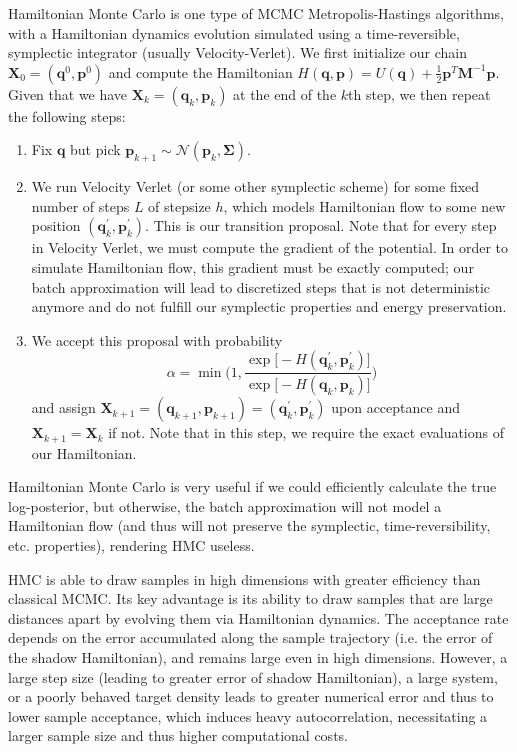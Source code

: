 \documentclass{article}
\begin{document}
    Hamiltonian Monte Carlo is one type of MCMC Metropolis-Hastings algorithms, with a Hamiltonian dynamics evolution simulated using a time-reversible, symplectic integrator (usually Velocity-Verlet). We first initialize our chain $\mathbf{X}_0 = (\mathbf{q}^0, \mathbf{p}^0)$ and compute the Hamiltonian $H(\mathbf{q}, \mathbf{p}) = U(\mathbf{q}) + \frac{1}{2} \mathbf{p}^T \mathbf{M}^{-1} \mathbf{p}$. Given that we have $\mathbf{X}_k = (\mathbf{q}_k, \mathbf{p}_k)$ at the end of the $k$th step, we then repeat the following steps: 
    \begin{enumerate}
        \item Fix $\mathbf{q}$ but pick $\mathbf{p}_{k+1} \sim \mathcal{N}(\mathbf{p}_k, \mathbf{\Sigma})$. 
        \item We run Velocity Verlet (or some other symplectic scheme) for some fixed number of steps $L$ of stepsize $h$, which models Hamiltonian flow to some new position $(\mathbf{q}_k^\prime, \mathbf{p}_k^\prime)$. This is our transition proposal. Note that for every step in Velocity Verlet, we must compute the gradient of the potential. In order to simulate Hamiltonian flow, this gradient must be exactly computed; our batch approximation will lead to discretized steps that is not deterministic anymore and do not fulfill our symplectic properties and energy preservation. 
        \item We accept this proposal with probability 
        \[\alpha = \min \bigg( 1, \frac{\exp \big[ -H(\mathbf{q}_k^\prime, \mathbf{p}_k^\prime) \big]}{\exp \big[ -H(\mathbf{q}_k, \mathbf{p}_k)\big]} \bigg)\]
        and assign $\mathbf{X}_{k+1} = (\mathbf{q}_{k+1}, \mathbf{p}_{k+1}) = (\mathbf{q}_k^\prime, \mathbf{p}_k^\prime)$ upon acceptance and $\mathbf{X}_{k+1} = \mathbf{X}_k$ if not. Note that in this step, we require the exact evaluations of our Hamiltonian. 
    \end{enumerate}
    Hamiltonian Monte Carlo is very useful if we could efficiently calculate the true log-posterior, but otherwise, the batch approximation will not model a Hamiltonian flow (and thus will not preserve the symplectic, time-reversibility, etc. properties), rendering HMC useless. 

    HMC is able to draw samples in high dimensions with greater efficiency than classical MCMC. Its key advantage is its ability to draw samples that are large distances apart by evolving them via Hamiltonian dynamics. The acceptance rate depends on the error accumulated along the sample trajectory (i.e. the error of the shadow Hamiltonian), and remains large even in high dimensions. However, a large step size (leading to greater error of shadow Hamiltonian), a large system, or a poorly behaved target density leads to greater numerical error and thus to lower sample acceptance, which induces heavy autocorrelation, necessitating a larger sample size and thus higher computational costs. 
\end{document}
